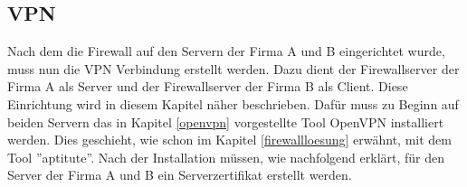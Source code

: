 \subsection{VPN}
Nach dem die Firewall auf den Servern der Firma A und B eingerichtet wurde, muss nun die VPN Verbindung erstellt werden. Dazu dient der Firewallserver der Firma A als Server und der Firewallserver der Firma B als Client. Diese Einrichtung wird in diesem Kapitel näher beschrieben. \newline
Dafür muss zu Beginn auf beiden Servern das in Kapitel \ref{openvpn} vorgestellte Tool OpenVPN installiert werden. Dies geschieht, wie schon im Kapitel \ref{firewallloesung}  erwähnt, mit dem Tool ''aptitute''. Nach der Installation müssen, wie nachfolgend erklärt, für den Server der Firma A und B ein Serverzertifikat erstellt werden.

